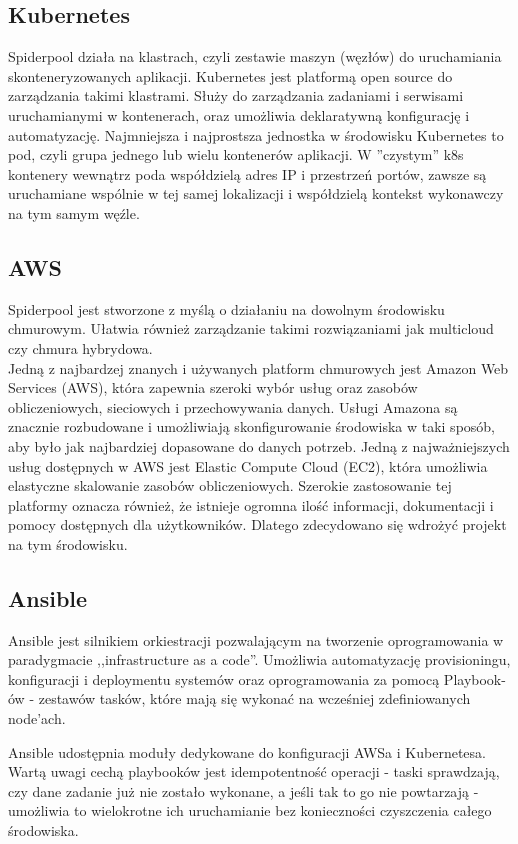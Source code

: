 \documentclass[onecolumn,12pt]{article}
\begin{document}
\subsection{Kubernetes}
Spiderpool działa na klastrach, czyli zestawie maszyn (węzłów) do uruchamiania skonteneryzowanych aplikacji. Kubernetes jest platformą open source do zarządzania takimi klastrami. Służy do zarządzania zadaniami i serwisami uruchamianymi w kontenerach, oraz umożliwia deklaratywną konfigurację i automatyzację. Najmniejsza i najprostsza jednostka w środowisku Kubernetes to pod, czyli grupa jednego lub wielu kontenerów aplikacji. 
W ''czystym'' k8s kontenery wewnątrz poda współdzielą adres IP i przestrzeń portów, zawsze są uruchamiane wspólnie w tej samej lokalizacji i współdzielą kontekst wykonawczy na tym samym węźle.

\subsection{AWS}
Spiderpool jest stworzone z myślą o działaniu na dowolnym środowisku chmurowym. Ułatwia również zarządzanie takimi rozwiązaniami jak multicloud czy chmura hybrydowa.\\
Jedną z najbardzej znanych i używanych platform chmurowych jest Amazon Web Services (AWS), która zapewnia szeroki wybór usług oraz zasobów obliczeniowych, sieciowych i przechowywania danych. Usługi Amazona są znacznie  rozbudowane i umożliwiają skonfigurowanie środowiska w taki sposób, aby było jak najbardziej dopasowane do danych potrzeb. Jedną z najważniejszych usług dostępnych w AWS jest Elastic Compute Cloud (EC2), która umożliwia elastyczne skalowanie zasobów obliczeniowych. Szerokie zastosowanie tej platformy oznacza również, że istnieje ogromna ilość informacji, dokumentacji i pomocy dostępnych dla użytkowników. Dlatego zdecydowano się wdrożyć projekt na tym środowisku.

\subsection{Ansible}
Ansible jest silnikiem orkiestracji pozwalającym na tworzenie oprogramowania w paradygmacie ,,infrastructure as a code''.
Umożliwia automatyzację provisioningu, konfiguracji i deploymentu systemów oraz oprogramowania za pomocą Playbook-ów - zestawów tasków, które mają się wykonać na wcześniej zdefiniowanych node'ach.

Ansible udostępnia moduły dedykowane do konfiguracji AWSa i Kubernetesa.
Wartą uwagi cechą playbooków jest idempotentność operacji - taski sprawdzają, czy dane zadanie już nie zostało wykonane, a jeśli tak to go nie powtarzają - umożliwia to wielokrotne ich uruchamianie bez konieczności czyszczenia całego środowiska.
\end{document}
